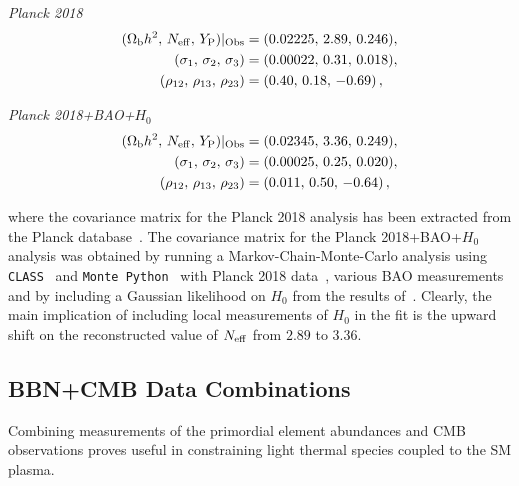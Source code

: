 \documentclass[notitlepage,letterpaper,natbib,aps,prd,onecolumn,amsmath,amsfonts,nofootinbib,preprintnumbers,superscriptaddress,secnumarabic,groupedaddress]{revtex4-1}
\begin{document}
\vspace{8pt}
\begin{minipage}{0.49\textwidth}
\centering \textit{Planck 2018}
\begin{align}\label{eq:CovarianceForm}
(\Omega_\mathrm{b} h^2,\,N_{\rm eff},\,Y_{\rm P})|_{\rm Obs} &= (0.02225,\, 2.89,\, 0.246),\nonumber  \\
(\sigma_{1},\,\sigma_{2},\,\sigma_{3}) &= (0.00022,\, 0.31,\, 0.018),  \\
(\rho_{12},\,\rho_{13},\,\rho_{23}) &= ( 0.40,\, 0.18,\, -0.69) \,, \nonumber
\end{align}
\end{minipage}
\begin{minipage}{0.45\textwidth}
\centering \textit{Planck 2018+BAO+$H_0$}
\begin{align}%
(\Omega_\mathrm{b} h^2,\,N_{\rm eff},\,Y_{\rm P})|_{\rm Obs} &= (0.02345,\, 3.36,\, 0.249), \nonumber  \\
(\sigma_{1},\,\sigma_{2},\,\sigma_{3}) &= (0.00025,\, 0.25,\, 0.020),      \\
(\rho_{12},\,\rho_{13},\,\rho_{23}) &= (0.011,\, 0.50,\, -0.64) \,  \nonumber,
\end{align}
\end{minipage}
\vspace{0.2cm}

 where the covariance matrix for the Planck 2018 analysis has been extracted from the Planck database~\cite{Aghanim:2018eyx,Aghanim:2019ame}. The covariance matrix for the Planck 2018+BAO+$H_0$ analysis was obtained by running a Markov-Chain-Monte-Carlo analysis using \texttt{CLASS}~\cite{Blas:2011rf,Lesgourgues:2011re} and \texttt{Monte Python}~\cite{Brinckmann:2018cvx,Audren:2012wb} with Planck 2018 data~\cite{Aghanim:2018eyx,Aghanim:2019ame}, various BAO measurements~\cite{Beutler:2011hx,Ross:2014qpa,Alam:2016hwk} and by including a Gaussian likelihood on $H_0$ from the results of~\cite{Riess:2019cxk}. Clearly, the main implication of including local measurements of $H_0$ in the fit is the upward shift on the reconstructed value of $N_{\rm eff}$ from $2.89$ to $3.36$. 
 

\subsection{BBN+CMB Data Combinations}\label{sec:Statistics}
Combining measurements of the primordial element abundances and CMB observations proves useful in constraining light thermal species coupled to the SM plasma.
\end{document}
